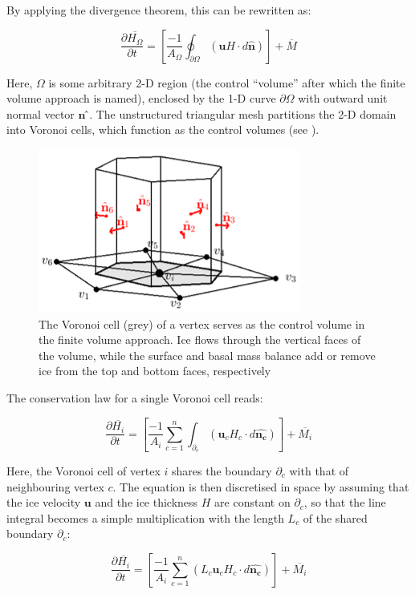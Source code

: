 \documentclass{article}
\begin{document}
By applying the divergence theorem, this can be rewritten as:

\begin{equation}
\frac{\partial \overline{H_{\Omega}}}{\partial t} = \left[ \frac{-1}{A_{\Omega}} \oint_{\partial \Omega} \left( \mathbf{u}H \cdot d\mathbf{\hat{n}} \right) \right] + \overline{M}
\end{equation}

Here, $\Omega$ is some arbitrary 2-D region (the control “volume” after which the finite volume approach is named), enclosed by the 1-D curve $\partial \Omega$ with outward unit normal vector $\textbf{\^{n}}$ ̂. The unstructured triangular mesh partitions the 2-D domain into Voronoi cells, which function as the control volumes (see ).

\begin{figure}[h!] \label{fig:masscontinuity}
  \includegraphics[width=0.3\linewidth]{Fig_masscontinuity.png}
  \caption{The Voronoi cell (grey) of a vertex serves as the control volume in the finite volume approach. Ice flows through the vertical faces of the volume, while the surface and basal mass balance add or remove ice from the top and bottom faces, respectively}
\end{figure}

The conservation law for a single Voronoi cell reads:

\begin{equation}
\frac{\partial \overline{H_i}}{\partial t} = \left[ \frac{-1}{A_i} \sum_{c=1}^n \int_{\partial_c} \left( \mathbf{u}_c H_c \cdot d\mathbf{\hat{n_c}} \right) \right] + \overline{M_i}
\end{equation}

Here, the Voronoi cell of vertex $i$ shares the boundary $\partial_c$ with that of neighbouring vertex $c$. The equation is then discretised in space by assuming that the ice velocity $\textbf{u}$ and the ice thickness $H$ are constant on $\partial_c$, so that the line integral becomes a simple multiplication with the length $L_c$ of the shared boundary $\partial_c$:

\begin{equation}
\frac{\partial \overline{H_i}}{\partial t} = \left[ \frac{-1}{A_i} \sum_{c=1}^n \left( L_c \mathbf{u}_c H_c \cdot d\mathbf{\hat{n_c}} \right) \right] + \overline{M_i}
\end{equation}
\end{document}
